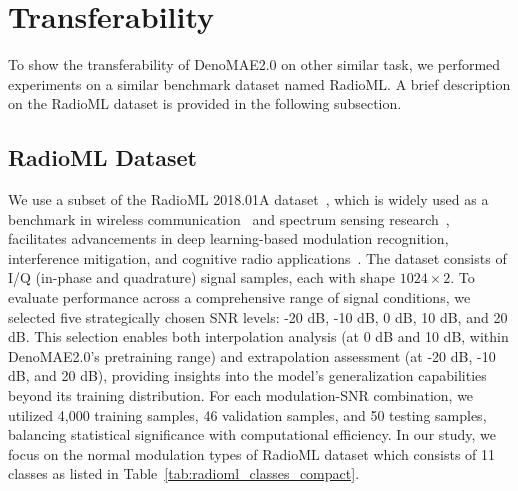 \section{Transferability}

To show the transferability of DenoMAE2.0 on other similar task, we performed experiments on a similar benchmark dataset named RadioML. A brief description on the RadioML dataset is provided in the following subsection.

\subsection{RadioML Dataset}

We use a subset of the RadioML 2018.01A dataset~\cite{o2018over}, which is widely used as a benchmark in wireless communication~\cite{ccamlibel2024automatic} and spectrum sensing research~\cite{elyousseph2021deep}, facilitates advancements in deep learning-based modulation recognition, interference mitigation, and cognitive radio applications~\cite{cheng2024automatic, jagatheesaperumal2024deep, 10014805}. The dataset consists of I/Q (in-phase and quadrature) signal samples, each with shape $1024 \times 2$. To evaluate performance across a comprehensive range of signal conditions, we selected five strategically chosen SNR levels: -20 dB, -10 dB, 0 dB, 10 dB, and 20 dB. This selection enables both interpolation analysis (at 0 dB and 10 dB, within DenoMAE2.0's pretraining range) and extrapolation assessment (at -20 dB, -10 dB, and 20 dB), providing insights into the model's generalization capabilities beyond its training distribution. For each modulation-SNR combination, we utilized 4,000 training samples, 46 validation samples, and 50 testing samples, balancing statistical significance with computational efficiency. In our study, we focus on the normal modulation types of RadioML dataset which consists of 11 classes as listed in Table~\ref{tab:radioml_classes_compact}.

